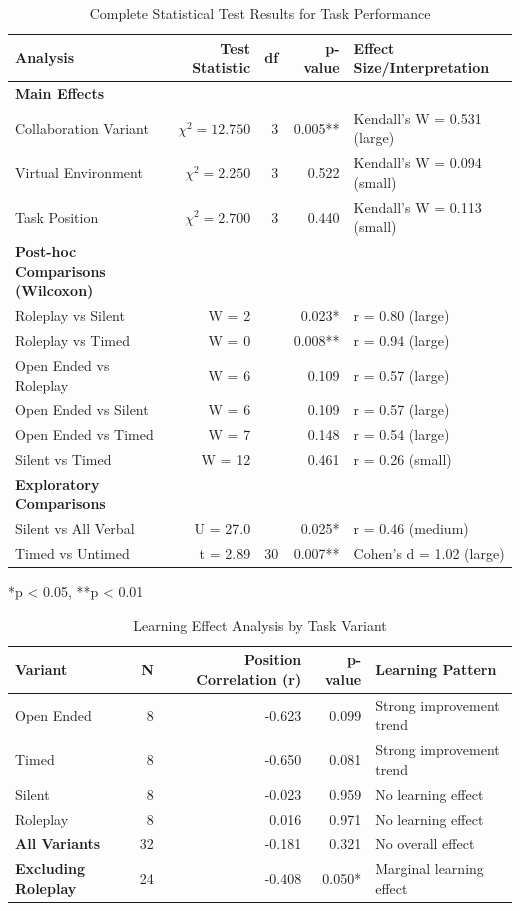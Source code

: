 \begin{table}[H]
\centering
\caption{Complete Statistical Test Results for Task Performance}
\label{tab:performance_stats_complete}
\begin{tabular}{lrrrl}
\toprule
\textbf{Analysis} & \textbf{Test Statistic} & \textbf{df} & \textbf{p-value} & \textbf{Effect Size/Interpretation} \\
\midrule
\textbf{Main Effects} & & & & \\
Collaboration Variant & $\chi^2 = 12.750$ & 3 & 0.005** & Kendall's W = 0.531 (large) \\
Virtual Environment & $\chi^2 = 2.250$ & 3 & 0.522 & Kendall's W = 0.094 (small) \\
Task Position & $\chi^2 = 2.700$ & 3 & 0.440 & Kendall's W = 0.113 (small) \\
\midrule
\textbf{Post-hoc Comparisons (Wilcoxon)} & & & & \\
Roleplay vs Silent & W = 2 & & 0.023* & r = 0.80 (large) \\
Roleplay vs Timed & W = 0 & & 0.008** & r = 0.94 (large) \\
Open Ended vs Roleplay & W = 6 & & 0.109 & r = 0.57 (large) \\
Open Ended vs Silent & W = 6 & & 0.109 & r = 0.57 (large) \\
Open Ended vs Timed & W = 7 & & 0.148 & r = 0.54 (large) \\
Silent vs Timed & W = 12 & & 0.461 & r = 0.26 (small) \\
\midrule
\textbf{Exploratory Comparisons} & & & & \\
Silent vs All Verbal & U = 27.0 & & 0.025* & r = 0.46 (medium) \\
Timed vs Untimed & t = 2.89 & 30 & 0.007** & Cohen's d = 1.02 (large) \\
\bottomrule
\end{tabular}
\small
*p < 0.05, **p < 0.01
\end{table}

\begin{table}[H]
\centering
\caption{Learning Effect Analysis by Task Variant}
\label{tab:learning_effects_complete}
\begin{tabular}{lrrrl}
\toprule
\textbf{Variant} & \textbf{N} & \textbf{Position Correlation (r)} & \textbf{p-value} & \textbf{Learning Pattern} \\
\midrule
Open Ended & 8 & -0.623 & 0.099 & Strong improvement trend \\
Timed & 8 & -0.650 & 0.081 & Strong improvement trend \\
Silent & 8 & -0.023 & 0.959 & No learning effect \\
Roleplay & 8 & 0.016 & 0.971 & No learning effect \\
\midrule
\textbf{All Variants} & 32 & -0.181 & 0.321 & No overall effect \\
\textbf{Excluding Roleplay} & 24 & -0.408 & 0.050* & Marginal learning effect \\
\bottomrule
\end{tabular}
\end{table}

